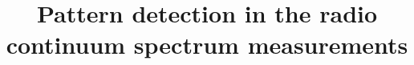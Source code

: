 \documentclass{aastex62}
\begin{document}
\title{Pattern detection in the radio continuum spectrum measurements} %


\end{document}
